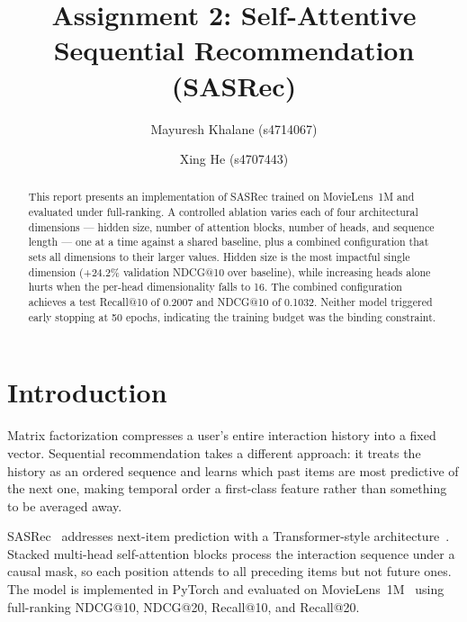 \documentclass[sigconf]{acmart}
\begin{document}
\title{Assignment 2: Self-Attentive Sequential Recommendation (SASRec)}

\author{Mayuresh Khalane (s4714067)}

\author{Xing He (s4707443)}

\begin{abstract}
This report presents an implementation of SASRec trained on MovieLens~1M and
evaluated under full-ranking. A controlled ablation varies each of four
architectural dimensions --- hidden size, number of attention blocks, number of
heads, and sequence length --- one at a time against a shared baseline, plus a
combined configuration that sets all dimensions to their larger values. Hidden
size is the most impactful single dimension (+24.2\% validation NDCG@10 over
baseline), while increasing heads alone hurts when the per-head dimensionality
falls to 16. The combined configuration achieves a test Recall@10 of 0.2007 and
NDCG@10 of 0.1032. Neither model triggered early stopping at 50 epochs,
indicating the training budget was the binding constraint.
\end{abstract}

\maketitle


\section{Introduction}

Matrix factorization compresses a user's entire interaction history into a fixed
vector. Sequential recommendation takes a different approach: it treats the
history as an ordered sequence and learns which past items are most predictive
of the next one, making temporal order a first-class feature rather than
something to be averaged away.

SASRec~\cite{kang2018self} addresses next-item prediction with a
Transformer-style architecture~\cite{vaswani2017attention}. Stacked multi-head
self-attention blocks process the interaction sequence under a causal mask, so
each position attends to all preceding items but not future ones. The model is
implemented in PyTorch and evaluated on MovieLens~1M~\cite{harper2015movielens}
using full-ranking NDCG@10, NDCG@20, Recall@10, and Recall@20.
\end{document}
